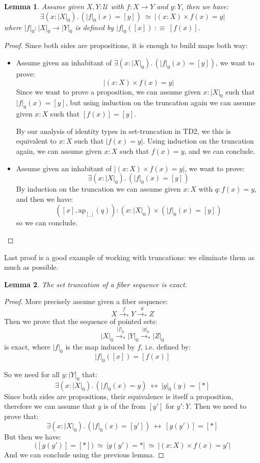 \documentclass{article}
\newcommand{\U}{{\mathcal U}}
\renewcommand{\r}{\rightarrow}
\newcommand{\ap}{\mathrm{ap}}
\newtheorem{lemma}{Lemma}
\begin{document}
\begin{lemma}
Assume given $X,Y:\U$ with $f:X\r Y$ and $y:Y$, then we have:
\[\exists(x:|X|_0).\,(|f|_0(x) = [y]) \ \simeq\ |(x:X)\times f(x)=y|\]
where $|f|_0:|X|_0\r |Y|_0$ is defined by $|f|_0([x])\ :\equiv\ [f(x)]$.
\end{lemma}
\begin{proof}
Since both sides are propositions, it is enough to build maps both way:
\begin{itemize}
\item Assume given an inhabitant of $\exists(x:|X|_0).\,(|f|_0(x) = [y])$, we want to prove: 
\[|(x:X)\times f(x)=y|\] 
Since we want to prove a proposition, we can assume given $x:|X|_0$ such that $|f|_0(x) = [y]$, but using induction on the truncation again we can assume given $x:X$ such that $[f(x)]=[y]$. 

By our analysis of identity types in set-truncation in TD2, we this is equivalent to $x:X$ such that $|f(x)=y|$. Using induction on the truncation again, we can assume given $x:X$ such that $f(x)=y$, and we can conclude.
\item Assume given an inhabitant of $|(x:X)\times f(x)=y|$, we want to prove:
\[\exists(x:|X|_0).\,(|f|_0(x) = [y])\]
By induction on the truncation we can assume given $x:X$ with $q:f(x)=y$, and then we have:
\[([x],\ap_{[\_]}(q)) : (x:|X|_0)\times (|f|_0(x) = [y])\]
so we can conclude.
\end{itemize}
\end{proof}

Last proof is a good example of working with truncations: we eliminate them as much as possible.

\begin{lemma}
The set truncation of a fiber sequence is exact.
\end{lemma}
\begin{proof}
More precisely assume given a fiber sequence:
\[X \overset{f}{\r_*} Y\overset{g}{\r_*} Z\] 
Then we prove that the sequence of pointed sets:
\[|X|_0\overset{|f|_0}{\r_*} |Y|_0\overset{|g|_0}{\r_*} |Z|_0\] 
is exact, where $|f|_0$ is the map induced by $f$, i.e. defined by: 
\[|f|_0([x]) = [f(x)]\] 

So we need for all $y:|Y|_0$ that: 
\[\exists(x:|X|_0).\,(|f|_0(x) = y) \ \leftrightarrow\ |g|_0(y)=[*] \]
Since both sides are propositions, their equivalence is itself a proposition, therefore we can assume that $y$ is of the from $[y']$ for $y':Y$. Then we need to prove that:
\[\exists(x:|X|_0).\,(|f|_0(x) = [y']) \ \leftrightarrow\ [g(y')]=[*] \]
But then we have:
\[ \big([g(y')]=[*]\big) \ \simeq\ |g(y')=*|\ \simeq\ |(x:X)\times f(x)=y'|\]
And we can conclude using the previous lemma.
\end{proof}
\end{document}

